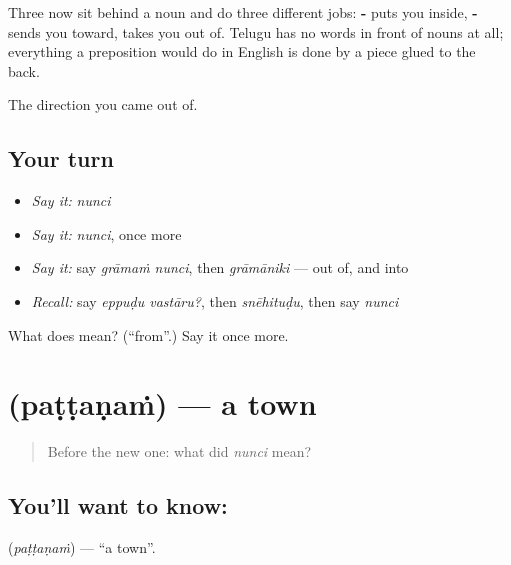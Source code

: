 \begin{grammarlens}[title={Grammar Lens: the third relation word}]
Three now sit behind a noun and do three different jobs: \textbf{-} puts you inside, \textbf{-} sends you toward, \textbf{} takes you out of. Telugu has no words in front of nouns at all; everything a preposition would do in English is done by a piece glued to the back.
\end{grammarlens}

\begin{grammarlens}[title={What you've built}]
The direction you came out of.
\end{grammarlens}

\subsection*{Your turn}
\begin{itemize}
\raggedright
  \item \emph{Say it:} \emph{nunci}
  \item \emph{Say it:} \emph{nunci}, once more
  \item \emph{Say it:} say \emph{grāmaṁ nunci}, then \emph{grāmāniki} — out of, and into
  \item \emph{Recall:} say \emph{eppuḍu vastāru?}, then \emph{snēhituḍu}, then say \emph{nunci}
\end{itemize}

\begin{tcolorbox}[breakable,colback=teal!4,colframe=teal!35!black,title={Before you move on}]
What does  mean? (\textquotedblleft{}from\textquotedblright{}.) Say it once more.
\end{tcolorbox}
\section[\texorpdfstring{\te{పట్టణం} (paṭṭaṇaṁ)}{పట్టణం (paṭṭaṇaṁ)}]{ (paṭṭaṇaṁ) — a town}

\label{lesson:TE-C77-town}



\begin{quote}
Before the new one: what did \emph{nunci} mean?
\end{quote}

\subsection*{You'll want to know: }
\textbf{} (\emph{paṭṭaṇaṁ}) — \textquotedblleft{}a town\textquotedblright{}.

